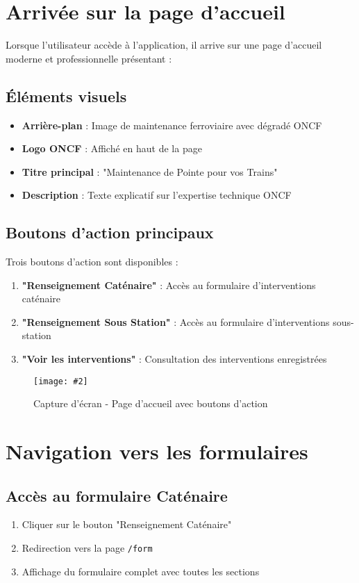 \documentclass[12pt,a4paper]{report}
\newcommand{\screenshot}[3][]{%
\begin{figure}[H]
\centering
\texttt{[image: \#2]}
\caption{#3}
\end{figure}
}
\begin{document}
\section{Arrivée sur la page d'accueil}

Lorsque l'utilisateur accède à l'application, il arrive sur une page d'accueil moderne et professionnelle présentant :

\subsection{Éléments visuels}
\begin{itemize}
    \item \textbf{Arrière-plan} : Image de maintenance ferroviaire avec dégradé ONCF
    \item \textbf{Logo ONCF} : Affiché en haut de la page
    \item \textbf{Titre principal} : "Maintenance de Pointe pour vos Trains"
    \item \textbf{Description} : Texte explicatif sur l'expertise technique ONCF
\end{itemize}

\subsection{Boutons d'action principaux}
Trois boutons d'action sont disponibles :

\begin{enumerate}
    \item \textbf{"Renseignement Caténaire"} : Accès au formulaire d'interventions caténaire
    \item \textbf{"Renseignement Sous Station"} : Accès au formulaire d'interventions sous-station
    \item \textbf{"Voir les interventions"} : Consultation des interventions enregistrées
\end{enumerate}

\screenshot{acceuil.png}{Capture d'écran - Page d'accueil avec boutons d'action}

\section{Navigation vers les formulaires}

\subsection{Accès au formulaire Caténaire}
\begin{enumerate}
    \item Cliquer sur le bouton "Renseignement Caténaire"
    \item Redirection vers la page \texttt{/form}
    \item Affichage du formulaire complet avec toutes les sections
\end{enumerate}
\end{document}
